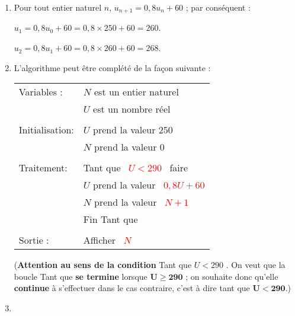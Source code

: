 \begin{corrige}
     \begin{enumerate}
          \item %
          Pour tout entier naturel $n$, ${u_{n+1}=0,8u_n+60}$ ; par conséquent :
          \par
          $u_{1}=0,8u_0+60=0,8 \times 250+60=260$.
          \par
          $u_{2}=0,8u_1+60=0,8 \times 260+60=268$.
          \item %
          L'algorithme peut être complété de la façon suivante :
          \begin{center}
               \begin{extern}%
                    \begin{tabular}{|l l|}\hline
                         Variables :	& $N$ est un entier naturel\\
                         & $U$ est un nombre réel\\
                         & \\
                         Initialisation: &$U$ prend la valeur $250$ \\
                         &$N$ prend la valeur $0$ \\
                         & \\
                         Traitement: &Tant que \textcolor{red}{\ $U<290$\ } faire\\
                         &\quad$U$ prend la valeur \textcolor{red}{\ $0,8U+60$}\\
                         &\quad$N$ prend la valeur \textcolor{red}{\ $N+1$\ }\\
                         &Fin Tant que\\
                         & \\
                         Sortie :	&Afficher \textcolor{red}{\ $N$\ } \\
                         \hline
                    \end{tabular}
               \end{extern}
          \end{center}
          (\textbf{Attention au sens de la condition} \og Tant que ${U<290}$ \fg{}. On veut que la boucle \og Tant que \fg{} \textbf{se termine} lorsque  $\bm{U \geqslant 290}$ ; on souhaite donc qu'elle \textbf{continue} à s'effectuer dans le cas contraire, c'est à dire tant que $\bm{U<290}$.)
          \item %

\end{enumerate}
\end{corrige}
